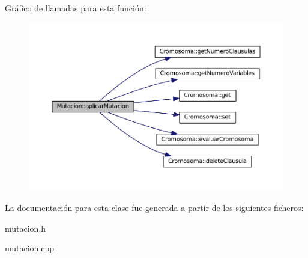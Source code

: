 Gráfico de llamadas para esta función\-:\nopagebreak
\begin{figure}[H]
\begin{center}
\leavevmode
\includegraphics[width=350pt]{classMutacion_aad417b36379e665d5c9249f133020d93_cgraph}
\end{center}
\end{figure}




La documentación para esta clase fue generada a partir de los siguientes ficheros\-:\begin{DoxyCompactItemize}
\item 
mutacion.\-h\item 
mutacion.\-cpp\end{DoxyCompactItemize}
